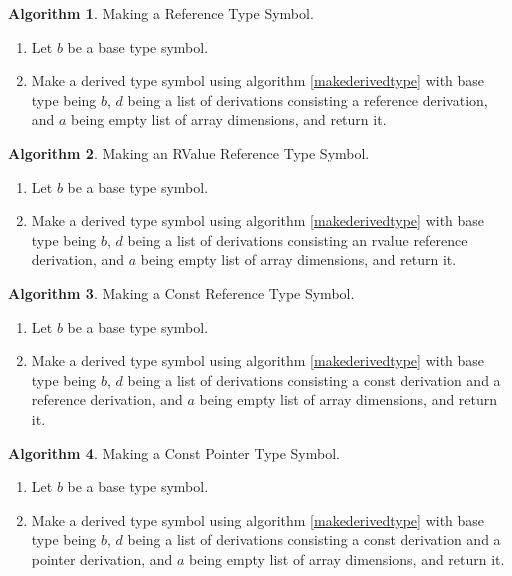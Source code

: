 \documentclass[a4paper,oneside,11pt]{book}
\theoremstyle{definition}
\newtheorem{algo}{Algorithm}[section]
\begin{document}
\begin{algo}\label{makereferencetype} Making a Reference Type Symbol.
\begin{enumerate}
\item
Let $b$ be a base type symbol.
\item
Make a derived type symbol using algorithm \ref{makederivedtype} with base type being $b$,
$d$ being a list of derivations consisting a reference derivation,
and $a$ being empty list of array dimensions, and return it.
\end{enumerate}
\end{algo}

\begin{algo}\label{makervaluereftype} Making an RValue Reference Type Symbol.
\begin{enumerate}
\item
Let $b$ be a base type symbol.
\item
Make a derived type symbol using algorithm \ref{makederivedtype} with base type being $b$,
$d$ being a list of derivations consisting an rvalue reference derivation,
and $a$ being empty list of array dimensions, and return it.
\end{enumerate}
\end{algo}

\begin{algo}\label{makeconstreftype} Making a Const Reference Type Symbol.
\begin{enumerate}
\item
Let $b$ be a base type symbol.
\item
Make a derived type symbol using algorithm \ref{makederivedtype} with base type being $b$,
$d$ being a list of derivations consisting a const derivation and a reference derivation,
and $a$ being empty list of array dimensions, and return it.
\end{enumerate}
\end{algo}

\begin{algo}\label{makeconstpointertype} Making a Const Pointer Type Symbol.
\begin{enumerate}
\item
Let $b$ be a base type symbol.
\item
Make a derived type symbol using algorithm \ref{makederivedtype} with base type being $b$, $d$ being a list of derivations consisting a const derivation and a pointer derivation, and $a$ being empty list of array dimensions, and return it.
\end{enumerate}
\end{algo}
\end{document}
